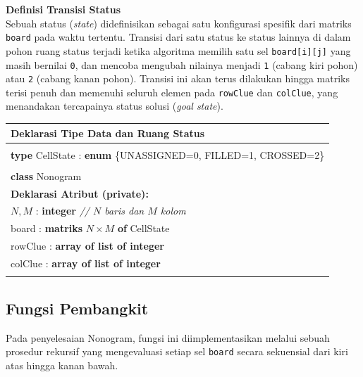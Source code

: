 \documentclass[conference]{IEEEtran}
\begin{document}
\textbf{Definisi Transisi Status} \\
Sebuah status (\textit{state}) didefinisikan sebagai satu konfigurasi spesifik dari matriks \texttt{board} pada waktu tertentu. Transisi dari satu status ke status lainnya di dalam pohon ruang status terjadi ketika algoritma memilih satu sel \texttt{board[i][j]} yang masih bernilai \texttt{0}, dan mencoba mengubah nilainya menjadi \texttt{1} (cabang kiri pohon) atau \texttt{2} (cabang kanan pohon). Transisi ini akan terus dilakukan hingga matriks terisi penuh dan memenuhi seluruh elemen pada \texttt{rowClue} dan \texttt{colClue}, yang menandakan tercapainya status solusi (\textit{goal state}).

\begin{table}[hbt!]
\centering
\begin{tabular}{|l|}
\hline
\textbf{Deklarasi Tipe Data dan Ruang Status} \\
\hline
\vspace{-0.5em} \\

\textbf{type} \textsf{CellState} : \textbf{enum} \{\textsf{UNASSIGNED}=0, \textsf{FILLED}=1, \textsf{CROSSED}=2\} \\
\\
\textbf{class} \textsf{Nonogram} \\
\quad \textbf{Deklarasi Atribut (private):} \\
\quad \quad $N, M$ : \textbf{integer} \textit{// $N$ baris dan $M$ kolom} \\
\quad \quad \textsf{board} : \textbf{matriks} $N \times M$ \textbf{of} \textsf{CellState} \\
\quad \quad \textsf{rowClue} : \textbf{array of list of integer} \\
\quad \quad \textsf{colClue} : \textbf{array of list of integer} \\
\vspace{-0.5em} \\
\hline
\end{tabular}
\label{tab:pseudo_nonogram}
\end{table}

\subsection{Fungsi Pembangkit}
Pada penyelesaian Nonogram, fungsi ini diimplementasikan melalui sebuah prosedur rekursif yang mengevaluasi setiap sel \texttt{board} secara sekuensial dari kiri atas hingga kanan bawah.
\end{document}
